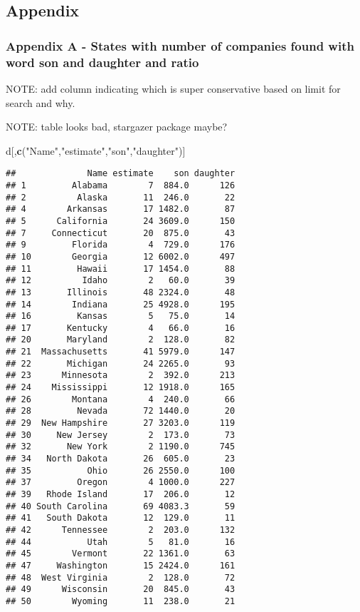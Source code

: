 \documentclass[]{article}
\newenvironment{Shaded}{\begin{snugshade}}{\end{snugshade}}
\newcommand{\KeywordTok}[1]{\textcolor[rgb]{0.13,0.29,0.53}{\textbf{#1}}}
\newcommand{\NormalTok}[1]{#1}
\newcommand{\StringTok}[1]{\textcolor[rgb]{0.31,0.60,0.02}{#1}}
\begin{document}
\hypertarget{appendix}{%
\subsection{Appendix}\label{appendix}}

\hypertarget{appendix-a---states-with-number-of-companies-found-with-word-son-and-daughter-and-ratio}{%
\subsubsection{Appendix A - States with number of companies found with
word son and daughter and
ratio}\label{appendix-a---states-with-number-of-companies-found-with-word-son-and-daughter-and-ratio}}

NOTE: add column indicating which is super conservative based on limit
for search and why.

NOTE: table looks bad, stargazer package maybe?

\begin{Shaded}
\begin{Highlighting}[]
\NormalTok{d[,}\KeywordTok{c}\NormalTok{(}\StringTok{"Name"}\NormalTok{,}\StringTok{"estimate"}\NormalTok{,}\StringTok{"son"}\NormalTok{,}\StringTok{"daughter"}\NormalTok{)]}
\end{Highlighting}
\end{Shaded}

\begin{verbatim}
##              Name estimate    son daughter
## 1         Alabama        7  884.0      126
## 2          Alaska       11  246.0       22
## 4        Arkansas       17 1482.0       87
## 5      California       24 3609.0      150
## 7     Connecticut       20  875.0       43
## 9         Florida        4  729.0      176
## 10        Georgia       12 6002.0      497
## 11         Hawaii       17 1454.0       88
## 12          Idaho        2   60.0       39
## 13       Illinois       48 2324.0       48
## 14        Indiana       25 4928.0      195
## 16         Kansas        5   75.0       14
## 17       Kentucky        4   66.0       16
## 20       Maryland        2  128.0       82
## 21  Massachusetts       41 5979.0      147
## 22       Michigan       24 2265.0       93
## 23      Minnesota        2  392.0      213
## 24    Mississippi       12 1918.0      165
## 26        Montana        4  240.0       66
## 28         Nevada       72 1440.0       20
## 29  New Hampshire       27 3203.0      119
## 30     New Jersey        2  173.0       73
## 32       New York        2 1190.0      745
## 34   North Dakota       26  605.0       23
## 35           Ohio       26 2550.0      100
## 37         Oregon        4 1000.0      227
## 39   Rhode Island       17  206.0       12
## 40 South Carolina       69 4083.3       59
## 41   South Dakota       12  129.0       11
## 42      Tennessee        2  203.0      132
## 44           Utah        5   81.0       16
## 45        Vermont       22 1361.0       63
## 47     Washington       15 2424.0      161
## 48  West Virginia        2  128.0       72
## 49      Wisconsin       20  845.0       43
## 50        Wyoming       11  238.0       21
\end{verbatim}
\end{document}
